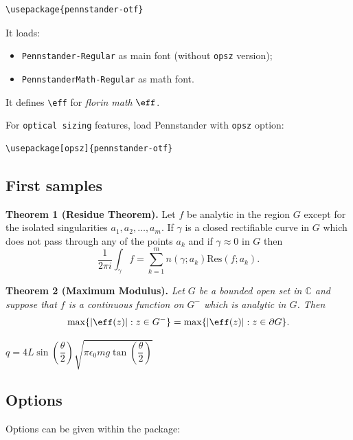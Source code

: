 \documentclass[a4paper]{scrartcl}
\newcommand*{\opt}[1]{\texttt{#1}}
\newcommand*{\cmd}[1]{\texttt{\textbackslash #1}}\newcommand*{\showtchar}[1]{\cmd{#1}~\csname #1\endcsname}
\begin{document}
\begin{verbatim}
\usepackage{pennstander-otf}
\end{verbatim}

It loads:

\begin{itemize}
	\item \opt{Pennstander-Regular} as main font (without \texttt{opsz} version);
	\item \opt{PennstanderMath-Regular} as math font.
\end{itemize}

It defines \cmd{eff} for \textit{florin math} $\eff$.

\bigskip

For \texttt{optical sizing} features, load Pennstander with \opt{opsz} option:

\begin{verbatim}
\usepackage[opsz]{pennstander-otf}
\end{verbatim}

\subsection{First samples}

\begin{oframed}
\textbf{Theorem 1 (Residue Theorem).}
Let $f$ be analytic in the region $G$ except for the isolated singularities $a_1,a_2,\ldots,a_m$. If $\gamma$ is a closed rectifiable curve in $G$ which does not pass through any of the points $a_k$ and if $\gamma\approx 0$ in $G$ then
\[
\frac{1}{2\pi i}\int_\gamma f = \sum_{k=1}^m n(\gamma;a_k) \text{Res}(f;a_k).
\]

\textbf{Theorem 2 (Maximum Modulus).}
\emph{Let $G$ be a bounded open set in $\mathbb{C}$ and suppose that $f$ is a continuous function on $G^-$ which is analytic in $G$. Then}
\[
\max\{|\eff(z)|:z\in G^-\}=\max \{|\eff(z)|:z\in \partial G \}.
\]
\end{oframed}

\begin{oframed}
$q = 4L \sin\left(\dfrac{\theta}{2}\right)\sqrt{\pi\epsilon_0mg\tan\left(\dfrac{\theta}{2}\right)}$
\end{oframed}

\pagebreak

\subsection{Options}

Options can be given within the package:
\end{document}
